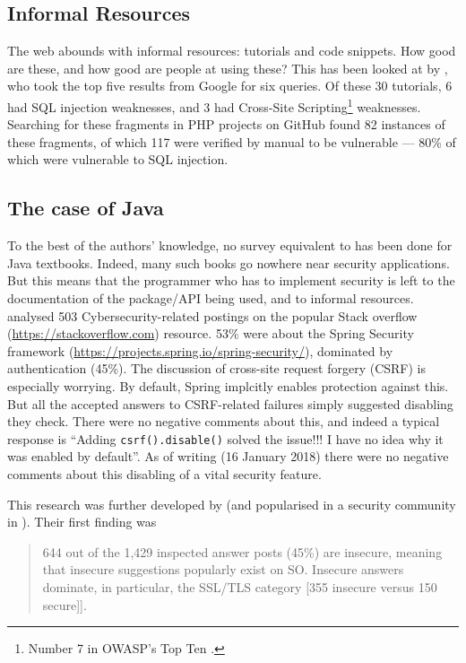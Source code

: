 \documentclass[sigconf,anonymous]{acmart}
\begin{document}
\subsection{Informal Resources}\label{sec:informal}
The web abounds with informal resources: tutorials and code snippets. How good are these, and how good are people at using these? This has been looked at by \cite{Unruhetal2017a}, who took the top five results from Google for six queries. Of these 30 tutorials, 6 had SQL injection weaknesses, and 3 had Cross-Site Scripting\footnote{Number 7 in OWASP's Top Ten \cite{OWASP2017a}.} weaknesses. Searching for these fragments in PHP projects on GitHub found 82 instances of these fragments, of which 117 were verified by manual to be vulnerable --- 80\% of which were vulnerable to SQL injection.

\subsection{The case of Java}\label{sec:Java}
To the best of the authors' knowledge, no survey equivalent to \cite{Drop2019} has been done for Java textbooks. Indeed, many such books go nowhere near security applications.  But this means that the programmer who has to implement security is left to the documentation of the package/API being used, and to informal resources. \cite{Mengetal2018a} analysed 503 Cybersecurity-related postings on the popular Stack overflow (\url{https://stackoverflow.com}) resource.  53\% were about the Spring Security framework (\url{https://projects.spring.io/spring-security/}), dominated by authentication (45\%). The discussion \cite[\S4.3.1]{Mengetal2018a} of cross-site request forgery (CSRF) is especially worrying.  By default, Spring implcitly enables protection against this. But all the accepted answers to CSRF-related failures simply suggested disabling they check. There were no negative comments about this, and indeed a typical response is ``Adding \verb!csrf().disable()!
solved the issue!!! I have no idea why it was enabled by default''. As of writing (16 January 2018) there were no negative comments about this disabling of a vital security feature.
\par
This research was further developed by \cite{Chenetal2019a}  (and popularised in a security community in \cite{Zorz2019a}). Their first finding was
\begin{quote}
644 out of the 1,429 inspected answer posts
(45\%) are insecure, meaning that insecure suggestions
popularly exist on SO. Insecure answers dominate, in
particular, the SSL/TLS category [355 insecure versus 150 secure]].
\end{quote} 
\end{document}
